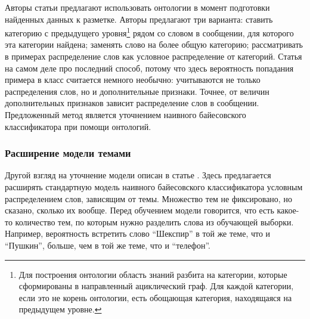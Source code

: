 Авторы статьи \cite{SaifHassanHeYulanAlani2012} предлагают использовать онтологии в момент
подготовки найденных данных к разметке. Авторы предлагают три варианта: ставить
категорию с предыдущего уровня\footnote{Для построения онтологии область знаний разбита на категории, которые сформированы в направленный
  ациклический граф. Для каждой категории, если это не корень онтологии, есть обощающая категория,
  находящаяся на предыдущем уровне.}
рядом со словом в сообщении, для которого эта категории
найдена; заменять слово на более общую категорию; рассматривать в примерах распределение слов как
условное распределение от категорий. Статья на самом деле про последний способ, потому что здесь
вероятность попадания примера в класс считается немного необычно: учитываются не только
распределения слов, но и дополнительные признаки. Точнее, от величин дополнительных признаков
зависит распределение слов в сообщении. Предложенный метод является уточнением наивного байесовского
классификатора при помощи онтологий.

\subsubsection{Расширение модели темами}
Другой взгляд на уточнение модели описан в статье \cite{Celikyilmaz2010}. Здесь предлагается
расширять стандартную модель наивного байесовского классификатора условным распределением слов, зависящим
от темы. Множество тем не фиксировано, но сказано, сколько их вообще. Перед обучением модели
говорится, что есть какое-то количество тем, по которым нужно разделить слова из обучающей выборки. Например,
вероятность встретить слово ``Шекспир'' в той же теме, что и ``Пушкин'', больше, чем в той же теме,
что и ``телефон''.
